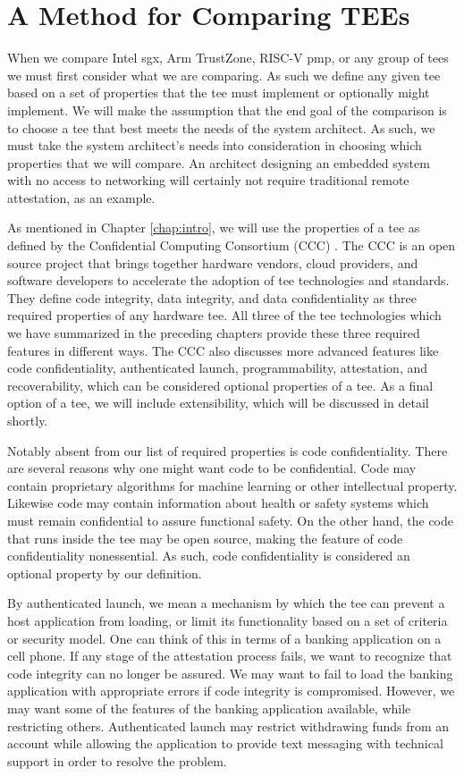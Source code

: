 \section{A Method for Comparing TEEs}
When we compare Intel \gls{sgx}, Arm TrustZone, RISC-V \gls{pmp}, or any group of \glspl{tee} we must first consider what we are comparing. As such we define any given \gls{tee} based on a set of properties that the \gls{tee} must implement or optionally might implement. We will make the assumption that the end goal of the comparison is to choose a \gls{tee} that best meets the needs of the system architect. As such, we must take the system architect's needs into consideration in choosing which properties that we will compare. An architect designing an embedded system with no access to networking will certainly not require traditional remote \gls{attestation}, as an example. 

As mentioned in Chapter \ref{chap:intro}, we will use the properties of a \gls{tee} as defined by the Confidential Computing Consortium (CCC) \cite{cccTAC}. The CCC is an open source project that brings together hardware vendors, cloud providers, and software developers to accelerate the adoption of \gls{tee} technologies and standards. They define code integrity, data integrity, and data confidentiality as three required properties of any hardware \gls{tee}. All three of the \gls{tee} technologies which we have summarized in the preceding chapters provide these three required features in different ways. The CCC also discusses more advanced features like code confidentiality, authenticated launch, programmability, \gls{attestation}, and recoverability, which can be considered optional properties of a \gls{tee}. As a final option of a \gls{tee}, we will include extensibility, which will be discussed in detail shortly.

Notably absent from our list of required properties is code confidentiality. There are several reasons why one might want code to be confidential. Code may contain proprietary algorithms for machine learning or other intellectual property. Likewise code may contain information about health or safety systems which must remain confidential to assure functional safety. On the other hand, the code that runs inside the \gls{tee} may be open source, making the feature of code confidentiality nonessential. As such, code confidentiality is considered an optional property by our definition.

By authenticated launch, we mean a mechanism by which the \gls{tee} can prevent a host application from loading, or limit its functionality based on a set of criteria or security model. One can think of this in terms of a banking application on a cell phone. If any stage of the \gls{attestation} process fails, we want to recognize that code integrity can no longer be assured. We may want to fail to load the banking application with appropriate errors if code integrity is compromised. However, we may want some of the features of the banking application available, while restricting others. Authenticated launch may restrict withdrawing funds from an account while allowing the application to provide text messaging with technical support in order to resolve the problem.

